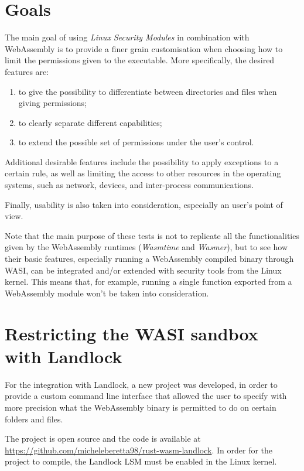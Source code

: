 \section{Goals}

The main goal of using \textit{Linux Security Modules} in combination with WebAssembly
is to provide a finer grain customisation when choosing how to limit the permissions given
to the executable. More specifically, the desired features are:
\begin{enumerate}
  \item to give the possibility to differentiate between directories and files when giving permissions;
  \item to clearly separate different capabilities;
  \item to extend the possible set of permissions under the user's control.
\end{enumerate}

Additional desirable features include the possibility to apply exceptions to a certain rule, as well
as limiting the access to other resources in the operating systems, such as network, devices, and
inter-process communications.

Finally, usability is also taken into consideration, especially an user's point of view.

Note that the main purpose of these tests is not to replicate all the functionalities given by
the WebAssembly runtimes (\textit{Wasmtime} and \textit{Wasmer}), but to see how their basic features,
especially running a WebAssembly compiled binary through WASI, can be integrated and/or extended with
security tools from the Linux kernel.
This means that, for example, running a single function exported from a WebAssembly module won't be taken
into consideration.

\section{Restricting the WASI sandbox with Landlock}
\label{sec:restricting-wasi-landlock}

For the integration with Landlock, a new project was developed, in order to provide
a custom command line interface that allowed the user to specify with more precision what
the WebAssembly binary is permitted to do on certain folders and files.

The project is open source and the code is available at \url{https://github.com/micheleberetta98/rust-wasm-landlock}.
In order for the project to compile, the Landlock LSM must be enabled in the Linux kernel.

